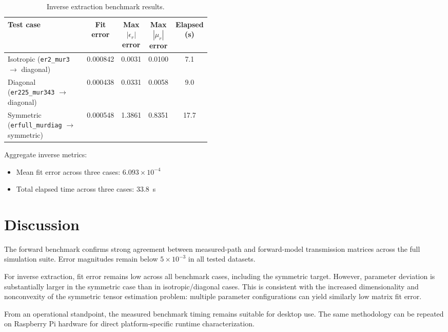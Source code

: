 \documentclass[11pt]{article}
\begin{document}
\begin{table}[h]
\centering
\caption{Inverse extraction benchmark results.}
\label{tab:inverse-results}
\begin{tabular}{>{\raggedright\arraybackslash}p{0.46\linewidth} S[table-format=1.6] S[table-format=1.4] S[table-format=1.4] S[table-format=2.1]}
\toprule
Test case & {Fit error} & {Max \(|\epsilon_r|\) error} & {Max \(|\mu_r|\) error} & {Elapsed (s)} \\
\midrule
Isotropic (\texttt{er2\_mur3} \(\rightarrow\) diagonal) & 0.000842 & 0.0031 & 0.0100 & 7.1 \\
Diagonal (\texttt{er225\_mur343} \(\rightarrow\) diagonal) & 0.000438 & 0.0331 & 0.0058 & 9.0 \\
Symmetric (\texttt{erfull\_murdiag} \(\rightarrow\) symmetric) & 0.000548 & 1.3861 & 0.8351 & 17.7 \\
\bottomrule
\end{tabular}
\end{table}

Aggregate inverse metrics:
\begin{itemize}
    \item Mean fit error across three cases: \(6.093\times 10^{-4}\)
    \item Total elapsed time across three cases: \SI{33.8}{s}
\end{itemize}

\section{Discussion}

The forward benchmark confirms strong agreement between measured-path and forward-model transmission matrices across the full simulation suite. Error magnitudes remain below \(5\times 10^{-3}\) in all tested datasets.

For inverse extraction, fit error remains low across all benchmark cases, including the symmetric target. However, parameter deviation is substantially larger in the symmetric case than in isotropic/diagonal cases. This is consistent with the increased dimensionality and nonconvexity of the symmetric tensor estimation problem: multiple parameter configurations can yield similarly low matrix fit error.

From an operational standpoint, the measured benchmark timing remains suitable for desktop use. The same methodology can be repeated on Raspberry Pi hardware for direct platform-specific runtime characterization.
\end{document}
